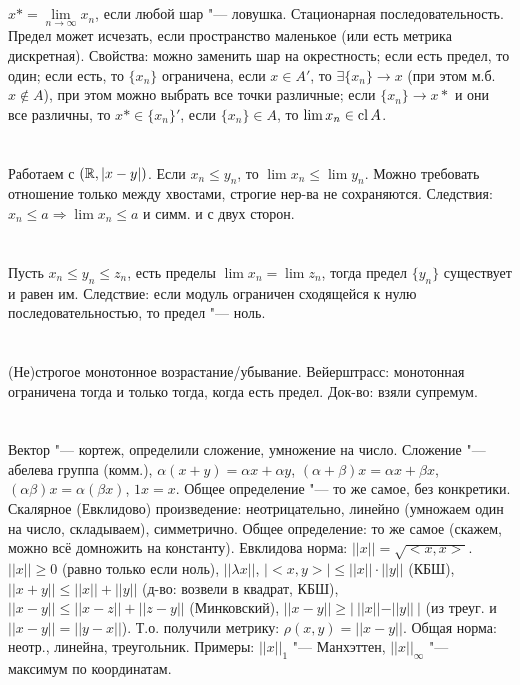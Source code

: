 \section{} %
$x* = \lim\limits_{n\to\infty} x_n$, если любой шар "--- ловушка. Стационарная последовательность.
Предел может исчезать, если пространство маленькое (или есть метрика дискретная).
Свойства: можно заменить шар на окрестность; если есть предел, то один; если есть, то $\{x_n\}$ ограничена,
если $x \in A'$, то $\exists \{x_n\}\to x$ (при этом м.б. $x \notin A$), при этом можно выбрать все точки различные;
если $\{x_n\} \to x*$ и они все различны, то $x* \in \{x_n\}'$, если $\{x_n\} \in A$, то $\lim x_n \in \operatorname{cl} A$.

\section{} %
Работаем с $(\mathbb{R}, |x-y|)$. Если $x_n \le y_n$, то $\lim x_n \le \lim y_n$. Можно требовать отношение
только между хвостами, строгие нер-ва не сохраняются. Следствия: $x_n \le a \Rightarrow \lim x_n \le a$ и
симм. и с двух сторон.

\section{} %
Пусть $x_n \le y_n \le z_n$, есть пределы $\lim x_n = \lim z_n$, тогда предел $\{y_n\}$ существует и равен им.
Следствие: если модуль ограничен сходящейся к нулю последовательностью, то предел "--- ноль.

\section{} %
(Не)строгое монотонное возрастание/убывание. Вейерштрасс: монотонная ограничена тогда и только тогда,
когда есть предел. Док-во: взяли супремум.

\section{} %
Вектор "--- кортеж, определили сложение, умножение на число. Сложение "--- абелева группа (комм.),
$\alpha(x+y)=\alpha x+\alpha y$, $(\alpha+\beta)x=\alpha x + \beta x$, $(\alpha\beta)x=\alpha(\beta x)$,
$1x=x$. Общее определение "--- то же самое, без конкретики. Скалярное (Евклидово) произведение: неотрицательно,
линейно (умножаем один на число, складываем), симметрично. Общее определение: то же самое
(скажем, можно всё домножить на константу). Евклидова норма: $||x||=\sqrt{<x,x>}$. $||x||\ge0$ (равно только если
ноль), $||\lambda x||$, $|<x,y>|\le||x||\cdot||y||$ (КБШ), $||x+y||\le ||x|| + ||y||$ (д-во: возвели
в квадрат, КБШ), $||x-y||\le||x-z||+||z-y||$ (Минковский), $||x-y|| \ge |~||x||-||y||~|$ (из треуг. и $||x-y||=||y-x||$).
Т.о. получили метрику: $\rho(x,y)=||x-y||$. Общая норма: неотр., линейна, треугольник. Примеры: $||x||_1$ "--- Манхэттен,
$||x||_\infty$ "--- максимум по координатам.

